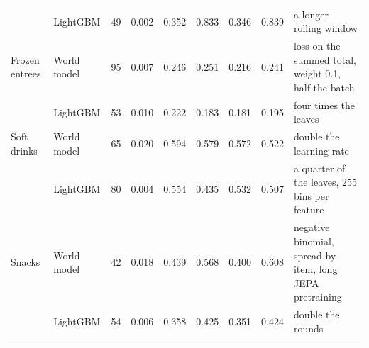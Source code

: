 \begin{table}[t]
\begin{tabular}{llrrrrrrp{5.2cm}}
 & LightGBM & 49 & 0.002 & 0.352 & 0.833 & 0.346 & 0.839 & a longer rolling window \\
\addlinespace[2pt]
Frozen entrees & World model & 95 & 0.007 & 0.246 & 0.251 & 0.216 & 0.241 & loss on the summed total, weight 0.1, half the batch \\
 & LightGBM & 53 & 0.010 & 0.222 & 0.183 & 0.181 & 0.195 & four times the leaves \\
\addlinespace[2pt]
Soft drinks & World model & 65 & 0.020 & 0.594 & 0.579 & 0.572 & 0.522 & double the learning rate \\
 & LightGBM & 80 & 0.004 & 0.554 & 0.435 & 0.532 & 0.507 & a quarter of the leaves, 255 bins per feature \\
\addlinespace[2pt]
Snacks & World model & 42 & 0.018 & 0.439 & 0.568 & 0.400 & 0.608 & negative binomial, spread by item, long JEPA pretraining \\
 & LightGBM & 54 & 0.006 & 0.358 & 0.425 & 0.351 & 0.424 & double the rounds \\
\addlinespace[2pt]
\bottomrule
\end{tabular}
\end{table}
